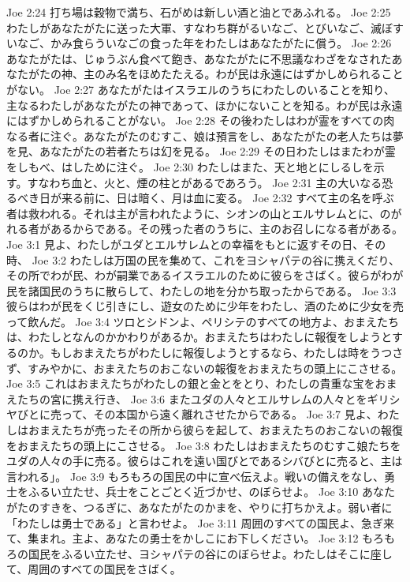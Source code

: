 Joe 2:24  打ち場は穀物で満ち、石がめは新しい酒と油とであふれる。
Joe 2:25  わたしがあなたがたに送った大軍、すなわち群がるいなご、とびいなご、滅ぼすいなご、かみ食らういなごの食った年をわたしはあなたがたに償う。
Joe 2:26  あなたがたは、じゅうぶん食べて飽き、あなたがたに不思議なわざをなされたあなたがたの神、主のみ名をほめたたえる。わが民は永遠にはずかしめられることがない。
Joe 2:27  あなたがたはイスラエルのうちにわたしのいることを知り、主なるわたしがあなたがたの神であって、ほかにないことを知る。わが民は永遠にはずかしめられることがない。
Joe 2:28  その後わたしはわが霊をすべての肉なる者に注ぐ。あなたがたのむすこ、娘は預言をし、あなたがたの老人たちは夢を見、あなたがたの若者たちは幻を見る。
Joe 2:29  その日わたしはまたわが霊をしもべ、はしために注ぐ。
Joe 2:30  わたしはまた、天と地とにしるしを示す。すなわち血と、火と、煙の柱とがあるであろう。
Joe 2:31  主の大いなる恐るべき日が来る前に、日は暗く、月は血に変る。
Joe 2:32  すべて主の名を呼ぶ者は救われる。それは主が言われたように、シオンの山とエルサレムとに、のがれる者があるからである。その残った者のうちに、主のお召しになる者がある。
Joe 3:1  見よ、わたしがユダとエルサレムとの幸福をもとに返すその日、その時、
Joe 3:2  わたしは万国の民を集めて、これをヨシャパテの谷に携えくだり、その所でわが民、わが嗣業であるイスラエルのために彼らをさばく。彼らがわが民を諸国民のうちに散らして、わたしの地を分かち取ったからである。
Joe 3:3  彼らはわが民をくじ引きにし、遊女のために少年をわたし、酒のために少女を売って飲んだ。
Joe 3:4  ツロとシドンよ、ペリシテのすべての地方よ、おまえたちは、わたしとなんのかかわりがあるか。おまえたちはわたしに報復をしようとするのか。もしおまえたちがわたしに報復しようとするなら、わたしは時をうつさず、すみやかに、おまえたちのおこないの報復をおまえたちの頭上にこさせる。
Joe 3:5  これはおまえたちがわたしの銀と金とをとり、わたしの貴重な宝をおまえたちの宮に携え行き、
Joe 3:6  またユダの人々とエルサレムの人々とをギリシヤびとに売って、その本国から遠く離れさせたからである。
Joe 3:7  見よ、わたしはおまえたちが売ったその所から彼らを起して、おまえたちのおこないの報復をおまえたちの頭上にこさせる。
Joe 3:8  わたしはおまえたちのむすこ娘たちをユダの人々の手に売る。彼らはこれを遠い国びとであるシバびとに売ると、主は言われる」。
Joe 3:9  もろもろの国民の中に宣べ伝えよ。戦いの備えをなし、勇士をふるい立たせ、兵士をことごとく近づかせ、のぼらせよ。
Joe 3:10  あなたがたのすきを、つるぎに、あなたがたのかまを、やりに打ちかえよ。弱い者に「わたしは勇士である」と言わせよ。
Joe 3:11  周囲のすべての国民よ、急ぎ来て、集まれ。主よ、あなたの勇士をかしこにお下しください。
Joe 3:12  もろもろの国民をふるい立たせ、ヨシャパテの谷にのぼらせよ。わたしはそこに座して、周囲のすべての国民をさばく。
